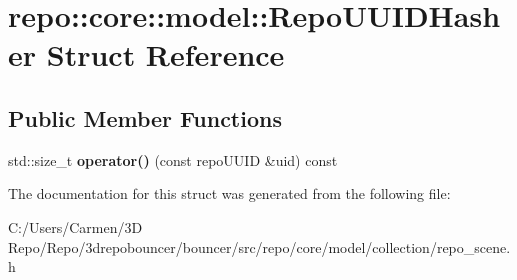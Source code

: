 \hypertarget{structrepo_1_1core_1_1model_1_1_repo_u_u_i_d_hasher}{}\section{repo\+:\+:core\+:\+:model\+:\+:Repo\+U\+U\+I\+D\+Hasher Struct Reference}
\label{structrepo_1_1core_1_1model_1_1_repo_u_u_i_d_hasher}
\subsection*{Public Member Functions}
\begin{DoxyCompactItemize}
\item 
\hypertarget{structrepo_1_1core_1_1model_1_1_repo_u_u_i_d_hasher_a5ad0c50eff46364ea58c732b7578b83c}{}std\+::size\+\_\+t {\bfseries operator()} (const repo\+U\+U\+I\+D \&uid) const \label{structrepo_1_1core_1_1model_1_1_repo_u_u_i_d_hasher_a5ad0c50eff46364ea58c732b7578b83c}

\end{DoxyCompactItemize}


The documentation for this struct was generated from the following file\+:\begin{DoxyCompactItemize}
\item 
C\+:/\+Users/\+Carmen/3\+D Repo/\+Repo/3drepobouncer/bouncer/src/repo/core/model/collection/repo\+\_\+scene.\+h\end{DoxyCompactItemize}
